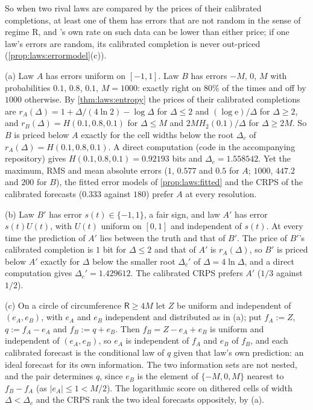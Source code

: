 So when two rival laws are compared by the prices of their calibrated completions, at least one of them has errors that are not random in the sense of regime R, and \SAIabbr's own rate on such data can be lower than either price; if one law's errors are random, its calibrated completion is never out-priced (\cref{prop:laws:errormodel}(c)).

\begin{example}\label{ex:laws:rival}
(a) Law $A$ has errors uniform on $[-1,1]$. Law $B$ has errors $-M$, $0$, $M$ with probabilities $0.1$, $0.8$, $0.1$, $M=1000$: exactly right on $80\%$ of the times and off by $1000$ otherwise. By \cref{thm:laws:entropy} the prices of their calibrated completions are $r_A(\Delta)=1+\Delta/(4\ln2)-\log\Delta$ for $\Delta\le2$ and $(\log\mathrm e)/\Delta$ for $\Delta\ge2$, and $r_B(\Delta)=H(0.1,0.8,0.1)$ for $\Delta\le M$ and $2MH_2(0.1)/\Delta$ for $\Delta\ge2M$. So $B$ is priced below $A$ exactly for the cell widths below the root $\Delta_c$ of $r_A(\Delta)=H(0.1,0.8,0.1)$. A direct computation (code in the accompanying repository) gives $H(0.1,0.8,0.1)=0.92193$ bits and $\Delta_c=1.558542$. Yet the maximum, RMS and mean absolute errors ($1$, $0.577$ and $0.5$ for $A$; $1000$, $447.2$ and $200$ for $B$), the fitted error models of \cref{prop:laws:fitted} and the CRPS of the calibrated forecasts ($0.333$ against $180$) prefer $A$ at every resolution.

(b) Law $B'$ has error $s(t)\in\{-1,1\}$, a fair sign, and law $A'$ has error $s(t)U(t)$, with $U(t)$ uniform on $[0,1]$ and independent of $s(t)$. At every time the prediction of $A'$ lies between the truth and that of $B'$. The price of $B'$'s calibrated completion is $1$ bit for $\Delta\le2$ and that of $A'$ is $r_A(\Delta)$, so $B'$ is priced below $A'$ exactly for $\Delta$ below the smaller root $\Delta_c'$ of $\Delta=4\ln\Delta$, and a direct computation gives $\Delta_c'=1.429612$. The calibrated CRPS prefers $A'$ ($1/3$ against $1/2$).

(c) On a circle of circumference $\mathsf R\ge4M$ let $Z$ be uniform and independent of $(e_A,e_B)$, with $e_A$ and $e_B$ independent and distributed as in (a); put $f_A:=Z$, $q:=f_A-e_A$ and $f_B:=q+e_B$. Then $f_B=Z-e_A+e_B$ is uniform and independent of $(e_A,e_B)$, so $e_A$ is independent of $f_A$ and $e_B$ of $f_B$, and each calibrated forecast is the conditional law of $q$ given that law's own prediction: an ideal forecast for its own information. The two information sets are not nested, and the pair determines $q$, since $e_B$ is the element of $\{-M,0,M\}$ nearest to $f_B-f_A$ (as $\lvert e_A\rvert\le1<M/2$). The logarithmic score on dithered cells of width $\Delta<\Delta_c$ and the CRPS rank the two ideal forecasts oppositely, by (a).
\end{example}

